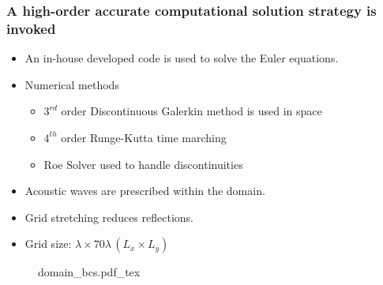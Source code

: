 \begin{frame} \frametitle{A high-order accurate computational solution strategy is invoked}
  \begin{minipage}{0.62\textwidth}
    \begin{itemize}
    \item An in-house developed code is used to solve the Euler equations.
    \item Numerical methods
      \begin{itemize}
      \item $3^{rd}$ order Discontinuous Galerkin method is used in space
      \item $4^{th}$ order Runge-Kutta time marching
      \item Roe Solver used to handle discontinuities
      \end{itemize}
    \item Acoustic waves are prescribed within the domain.
    \item Grid stretching reduces reflections.
    \item Grid size: $\lambda \times 70\lambda \, (L_x \times L_y)$
    \end{itemize}
  \end{minipage}
  \hfill%
  \begin{minipage}{0.34\textwidth}
    \begin{figure}
      \centering
      \def\svgwidth{\textwidth}
      {\footnotesize
        {domain_bcs.pdf_tex}%
      }
    \end{figure}
  \end{minipage}
\end{frame}
